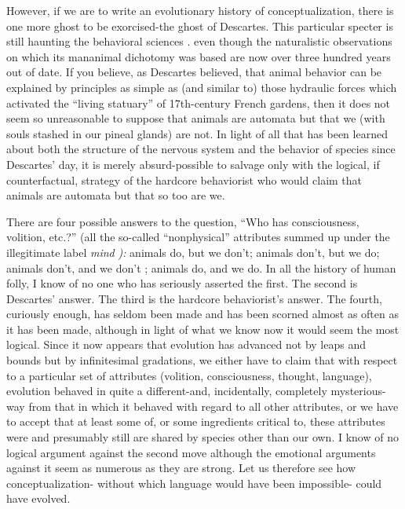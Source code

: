 However, if we are to write an evolutionary history of con\-ceptualization, there is one more ghost to be exorcised-the ghost of Descartes. This particular specter is still haunting the behavioral sci\-ences . even though the naturalistic observations on which its man\-animal dichotomy was based are now over three hundred years out of date. If you believe, as Descartes believed, that animal behavior can be explained by principles as simple as (and similar to) those hydraulic forces which activated the ``living statuary'' of 17th-century French gardens, then it does not seem so unreasonable to suppose that animals are automata but that we (with souls stashed in our pineal glands) are not. In light of all that has been learned about both the structure of the nervous system and the behavior of species since Descartes' day, it is merely absurd-possible to salvage only with the logical, if counter\-factual, strategy of the hardcore behaviorist who would claim that animals are automata but that so too are we.


There are four possible answers to the question, ``Who has con\-sciousness, volition, etc.?'' (all the so-called ``nonphysical'' attributes summed up under the illegitimate label \textit{mind} \textit{):} animals do, but we don't; animals don't, but we do; animals don't, and we don't ; animals do, and we do. In all the history of human folly, I know of no one who has seriously asserted the first. The second is Descartes' answer. The third is the hardcore behaviorist's answer. The fourth, curiously enough, has seldom been made and has been scorned almost as often as it has been made, although in light of what we know now it would seem the most logical. Since it now appears that evolution has ad\-vanced not by leaps and bounds but by infinitesimal gradations, we either have to claim that with respect to a particular set of attributes (volition, consciousness, thought, language), evolution behaved in quite a different-and, incidentally, completely mysterious-way from that in which it behaved with regard to all other attributes, or we have to accept that at least some of, or some ingredients critical to, these attributes were and presumably still are shared by species other than our own. I know of no logical argument against the second move although the emotional arguments against it seem as numerous as they are strong. Let us therefore see how conceptualization- without which language would have been impossible- could have evolved.

